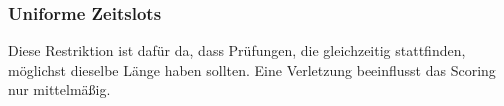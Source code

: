 \subsubsection{Uniforme Zeitslots}\label{subsubsec:uniformeZeitslots}
Diese Restriktion ist dafür da, dass Prüfungen, die gleichzeitig stattfinden, möglichst dieselbe Länge
haben sollten.
Eine Verletzung beeinflusst das Scoring nur mittelmäßig.
